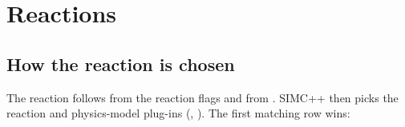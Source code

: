 \chapter{\texorpdfstring{Reactions}{Reactions}}\label{user_manual-05u5freactions}
\section{\texorpdfstring{How the reaction is chosen}{How the reaction is chosen}}\label{user_manual-05u5freactions:51-how-the-reaction-is-chosen}
The reaction follows from the reaction flags and from \hyperref[param:targu25A]{}. SIMC++ then picks the reaction and physics-model plug-ins
(, ). The first matching row wins:

